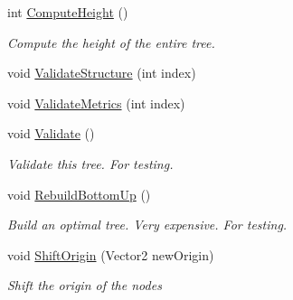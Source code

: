 \begin{DoxyCompactItemize}
int \hyperlink{class_farseer_physics_1_1_collision_1_1_dynamic_tree_3_01_t_01_4_adf2f764f06bac1d1c092c250b082e426}{Compute\+Height} ()
\begin{DoxyCompactList}\small\item\em Compute the height of the entire tree. \end{DoxyCompactList}\item 
void \hyperlink{class_farseer_physics_1_1_collision_1_1_dynamic_tree_3_01_t_01_4_a5aa2309b59b253c8436ae9be4b5e4ccd}{Validate\+Structure} (int index)
\item 
void \hyperlink{class_farseer_physics_1_1_collision_1_1_dynamic_tree_3_01_t_01_4_abe2ce87d9b02b21c93b996e1c88ffdff}{Validate\+Metrics} (int index)
\item 
void \hyperlink{class_farseer_physics_1_1_collision_1_1_dynamic_tree_3_01_t_01_4_a8308acd4339b0343ef1807b2f85d1c9b}{Validate} ()
\begin{DoxyCompactList}\small\item\em Validate this tree. For testing. \end{DoxyCompactList}\item 
void \hyperlink{class_farseer_physics_1_1_collision_1_1_dynamic_tree_3_01_t_01_4_a20ec60fcfa527b244e00c0f910c44141}{Rebuild\+Bottom\+Up} ()
\begin{DoxyCompactList}\small\item\em Build an optimal tree. Very expensive. For testing. \end{DoxyCompactList}\item 
void \hyperlink{class_farseer_physics_1_1_collision_1_1_dynamic_tree_3_01_t_01_4_a4c603f926e2544f485f88ad68a9a936a}{Shift\+Origin} (Vector2 new\+Origin)
\begin{DoxyCompactList}\small\item\em Shift the origin of the nodes \end{DoxyCompactList}\end{DoxyCompactItemize}
